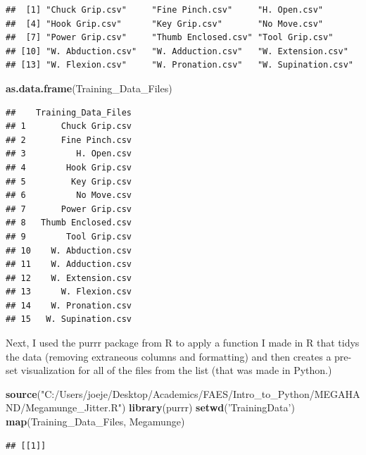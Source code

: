 \documentclass[]{article}
\newenvironment{Shaded}{\begin{snugshade}}{\end{snugshade}}
\newcommand{\KeywordTok}[1]{\textcolor[rgb]{0.13,0.29,0.53}{\textbf{#1}}}
\newcommand{\StringTok}[1]{\textcolor[rgb]{0.31,0.60,0.02}{#1}}
\newcommand{\NormalTok}[1]{#1}
\begin{document}
\begin{verbatim}
##  [1] "Chuck Grip.csv"     "Fine Pinch.csv"     "H. Open.csv"       
##  [4] "Hook Grip.csv"      "Key Grip.csv"       "No Move.csv"       
##  [7] "Power Grip.csv"     "Thumb Enclosed.csv" "Tool Grip.csv"     
## [10] "W. Abduction.csv"   "W. Adduction.csv"   "W. Extension.csv"  
## [13] "W. Flexion.csv"     "W. Pronation.csv"   "W. Supination.csv"
\end{verbatim}

\begin{Shaded}
\begin{Highlighting}[]
\KeywordTok{as.data.frame}\NormalTok{(Training_Data_Files)}
\end{Highlighting}
\end{Shaded}

\begin{verbatim}
##    Training_Data_Files
## 1       Chuck Grip.csv
## 2       Fine Pinch.csv
## 3          H. Open.csv
## 4        Hook Grip.csv
## 5         Key Grip.csv
## 6          No Move.csv
## 7       Power Grip.csv
## 8   Thumb Enclosed.csv
## 9        Tool Grip.csv
## 10    W. Abduction.csv
## 11    W. Adduction.csv
## 12    W. Extension.csv
## 13      W. Flexion.csv
## 14    W. Pronation.csv
## 15   W. Supination.csv
\end{verbatim}

Next, I used the purrr package from R to apply a function I made in R
that tidys the data (removing extraneous columns and formatting) and
then creates a pre-set visualization for all of the files from the list
(that was made in Python.)

\begin{Shaded}
\begin{Highlighting}[]
\KeywordTok{source}\NormalTok{(}\StringTok{"C:/Users/joeje/Desktop/Academics/FAES/Intro_to_Python/MEGAHAND/Megamunge_Jitter.R"}\NormalTok{)}
\KeywordTok{library}\NormalTok{(purrr)}
\KeywordTok{setwd}\NormalTok{(}\StringTok{'TrainingData'}\NormalTok{)}
\KeywordTok{map}\NormalTok{(Training_Data_Files, Megamunge)}
\end{Highlighting}
\end{Shaded}

\begin{verbatim}
## [[1]]
\end{verbatim}
\end{document}

